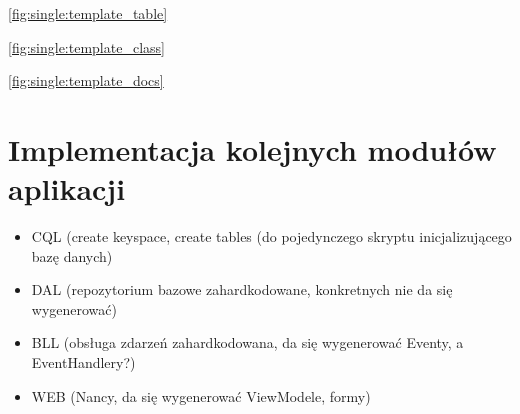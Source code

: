 \ref{fig:single:template_table}


\ref{fig:single:template_class}


\ref{fig:single:template_docs}




\section{Implementacja kolejnych modułów aplikacji}

\begin{itemize}
 \item CQL (create keyspace, create tables (do pojedynczego skryptu inicjalizującego bazę danych)
 \item DAL (repozytorium bazowe zahardkodowane, konkretnych nie da się wygenerować)
 \item BLL (obsługa zdarzeń zahardkodowana, da się wygenerować Eventy, a EventHandlery?)
 \item WEB (Nancy, da się wygenerować ViewModele, formy)
\end{itemize}
